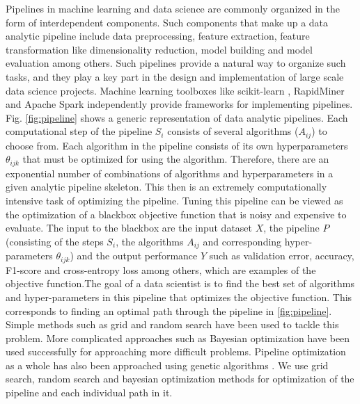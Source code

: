Pipelines in machine learning and data science are commonly organized in the form of interdependent components. Such components that make up a data analytic pipeline include data preprocessing, feature extraction, feature transformation like dimensionality reduction, model building and model evaluation among others. Such pipelines provide a natural way to organize such tasks, and they play a key part in the design and implementation of large scale data science projects. Machine learning toolboxes like scikit-learn \cite{pedregosa2011scikit}, RapidMiner \cite{mierswa2006yale} and Apache Spark \cite{spark2016apache} independently provide frameworks for implementing pipelines. Fig. \ref{fig:pipeline} shows a generic representation of data analytic pipelines. Each computational step of the pipeline $S_{i}$ consists of several algorithms ($A_{ij}$) to choose from. Each algorithm in the pipeline consists of its own hyperparameters $\theta_{ijk}$ that must be optimized for using the algorithm. Therefore, there are an exponential number of combinations of algorithms and hyperparameters in a given analytic pipeline skeleton. This then is an extremely computationally intensive task of optimizing the pipeline. Tuning this pipeline can be viewed as the optimization of a blackbox objective function that is noisy and expensive to evaluate. The input to the blackbox are the input dataset $X$, the pipeline $P$(consisting of the steps $S_{i}$, the algorithms $A_{ij}$ and corresponding hyper-parameters $\theta_{ijk}$) and the output performance $Y$ such as validation error, accuracy, F1-score and cross-entropy loss among others, which are examples of the objective function.The goal of a data scientist is to find the best set of algorithms and hyper-parameters in this pipeline that optimizes the objective function. This corresponds to finding an optimal path through the pipeline in \ref{fig:pipeline}.  Simple methods such as grid and random search \cite{bergstra2012random} have been used to tackle this problem. More complicated approaches such as Bayesian optimization \cite{snoek2012practical, zhang2016flash} have been used successfully for approaching more difficult problems. Pipeline optimization as a whole has also been approached using genetic algorithms \cite{olson2016evaluation, olson2016tpot, olson2016automating}.
We use grid search, random search and bayesian optimization methods for optimization of the pipeline and each individual path in it.  

